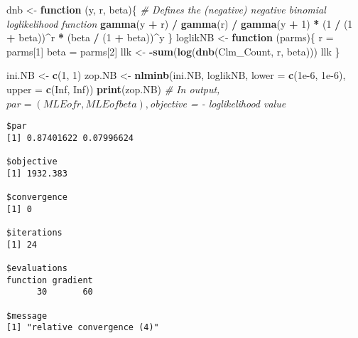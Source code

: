 \documentclass[]{book}
\newenvironment{Shaded}{\begin{snugshade}}{\end{snugshade}}
\newcommand{\KeywordTok}[1]{\textcolor[rgb]{0.13,0.29,0.53}{\textbf{#1}}}
\newcommand{\DataTypeTok}[1]{\textcolor[rgb]{0.13,0.29,0.53}{#1}}
\newcommand{\DecValTok}[1]{\textcolor[rgb]{0.00,0.00,0.81}{#1}}
\newcommand{\FloatTok}[1]{\textcolor[rgb]{0.00,0.00,0.81}{#1}}
\newcommand{\StringTok}[1]{\textcolor[rgb]{0.31,0.60,0.02}{#1}}
\newcommand{\CommentTok}[1]{\textcolor[rgb]{0.56,0.35,0.01}{\textit{#1}}}
\newcommand{\OtherTok}[1]{\textcolor[rgb]{0.56,0.35,0.01}{#1}}
\newcommand{\ControlFlowTok}[1]{\textcolor[rgb]{0.13,0.29,0.53}{\textbf{#1}}}
\newcommand{\OperatorTok}[1]{\textcolor[rgb]{0.81,0.36,0.00}{\textbf{#1}}}
\newcommand{\NormalTok}[1]{#1}
\theoremstyle{definition}
\theoremstyle{definition}
\theoremstyle{definition}
\theoremstyle{remark}
\begin{document}
\begin{Shaded}
\begin{Highlighting}[]
\NormalTok{dnb <-}\StringTok{ }\ControlFlowTok{function}\NormalTok{ (y, r, beta)\{}
\CommentTok{# Defines the (negative) negative binomial loglikelihood function  }
  \KeywordTok{gamma}\NormalTok{(y }\OperatorTok{+}\StringTok{ }\NormalTok{r) }\OperatorTok{/}\StringTok{ }\KeywordTok{gamma}\NormalTok{(r) }\OperatorTok{/}\StringTok{ }\KeywordTok{gamma}\NormalTok{(y }\OperatorTok{+}\StringTok{ }\DecValTok{1}\NormalTok{) }\OperatorTok{*}\StringTok{ }\NormalTok{(}\DecValTok{1} \OperatorTok{/}\StringTok{ }\NormalTok{(}\DecValTok{1} \OperatorTok{+}\StringTok{ }\NormalTok{beta))}\OperatorTok{^}\NormalTok{r }\OperatorTok{*}\StringTok{ }\NormalTok{(beta }\OperatorTok{/}\StringTok{ }\NormalTok{(}\DecValTok{1} \OperatorTok{+}\StringTok{ }\NormalTok{beta))}\OperatorTok{^}\NormalTok{y}
\NormalTok{\}}
\NormalTok{loglikNB <-}\StringTok{ }\ControlFlowTok{function}\NormalTok{ (parms)\{ }
\NormalTok{  r =}\StringTok{ }\NormalTok{parms[}\DecValTok{1}\NormalTok{]}
\NormalTok{  beta =}\StringTok{ }\NormalTok{parms[}\DecValTok{2}\NormalTok{]}
\NormalTok{  llk <-}\StringTok{ }\OperatorTok{-}\KeywordTok{sum}\NormalTok{(}\KeywordTok{log}\NormalTok{(}\KeywordTok{dnb}\NormalTok{(Clm_Count, r, beta)))}
\NormalTok{  llk}
\NormalTok{\} }

\NormalTok{ini.NB <-}\StringTok{ }\KeywordTok{c}\NormalTok{(}\DecValTok{1}\NormalTok{, }\DecValTok{1}\NormalTok{)}
\NormalTok{zop.NB <-}\StringTok{ }\KeywordTok{nlminb}\NormalTok{(ini.NB, loglikNB, }\DataTypeTok{lower =} \KeywordTok{c}\NormalTok{(}\FloatTok{1e-6}\NormalTok{, }\FloatTok{1e-6}\NormalTok{), }\DataTypeTok{upper =} \KeywordTok{c}\NormalTok{(}\OtherTok{Inf}\NormalTok{, }\OtherTok{Inf}\NormalTok{))}
\KeywordTok{print}\NormalTok{(zop.NB)  }\CommentTok{# In output, $par = (MLE of r, MLE of beta), $objective = - loglikelihood value}
\end{Highlighting}
\end{Shaded}

\begin{verbatim}
$par
[1] 0.87401622 0.07996624

$objective
[1] 1932.383

$convergence
[1] 0

$iterations
[1] 24

$evaluations
function gradient 
      30       60 

$message
[1] "relative convergence (4)"
\end{verbatim}
\end{document}
